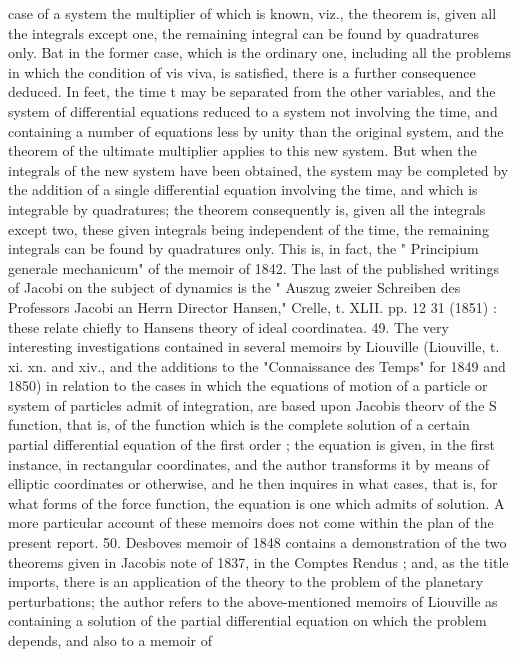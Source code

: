 \documentclass[12pt,a4paper]{article}
\theoremstyle{definition}
\begin{document}

case of a system the multiplier of which is known, viz., the theorem is, given all the
integrals except one, the remaining integral can be found by quadratures only. Bat
in the former case, which is the ordinary one, including all the problems in which the
condition of vis viva, is satisfied, there is a further consequence deduced. In feet, the
time t may be separated from the other variables, and the system of differential
equations reduced to a system not involving the time, and containing a number of
equations less by unity than the original system, and the theorem of the ultimate
multiplier applies to this new system. But when the integrals of the new system
have been obtained, the system may be completed by the addition of a single
differential equation involving the time, and which is integrable by quadratures; the
theorem consequently is, given all the integrals except two, these given integrals being
independent of the time, the remaining integrals can be found by quadratures only.
This is, in fact, the " Principium generale mechanicum" of the memoir of 1842.
The last of the published writings of Jacobi on the subject of dynamics is the
" Auszug zweier Schreiben des Professors Jacobi an Herrn Director Hansen," Crelle,
t. XLII. pp. 12 31 (1851) : these relate chiefly to Hansens theory of ideal coordinatea.
49. The very interesting investigations contained in several memoirs by Liouville
(Liouville, t. xi. xn. and xiv., and the additions to the "Connaissance des Temps" for
1849 and 1850) in relation to the cases in which the equations of motion of a
particle or system of particles admit of integration, are based upon Jacobis theorv of
the S function, that is, of the function which is the complete solution of a certain
partial differential equation of the first order ; the equation is given, in the first
instance, in rectangular coordinates, and the author transforms it by means of elliptic
coordinates or otherwise, and he then inquires in what cases, that is, for what forms
of the force function, the equation is one which admits of solution. A more particular
account of these memoirs does not come within the plan of the present report.
50. Desboves memoir of 1848 contains a demonstration of the two theorems
given
in Jacobis note of 1837, in the Comptes Rendus ; and, as the title imports, there is
an application of the theory to the problem of the planetary perturbations; the author
refers to the above-mentioned memoirs of Liouville as containing a solution of the
partial differential equation on which the problem depends, and also to a memoir of
\end{document}
